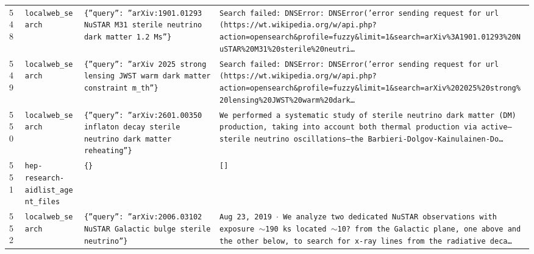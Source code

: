 \documentclass[11pt,a4paper]{article}
\begin{document}
\begin{longtable}{@{}p{}p{}p{}p{}@{}}
548 & \texttt{local}\newline\texttt{web\_\allowbreak{}search} & \texttt{\{''query'':\allowbreak{} ''arXiv:\allowbreak{}1901.01293 NuSTAR M31 sterile neutrino dark matter 1.2 Ms''\}\allowbreak{}} & \texttt{Search failed:\allowbreak{} DNSError:\allowbreak{} DNSError('error sending request for url (https:\allowbreak{}/\allowbreak{}/\allowbreak{}wt.wikipedia.org/\allowbreak{}w/\allowbreak{}api.php?action=\allowbreak{}opensearch\&profile=\allowbreak{}fuzzy\&limit=\allowbreak{}1\&search=\allowbreak{}arXiv\%3A1901.01293\%20NuSTAR\%20M31\%20sterile\%20neutri\ldots{}\allowbreak{}} \\
549 & \texttt{local}\newline\texttt{web\_\allowbreak{}search} & \texttt{\{''query'':\allowbreak{} ''arXiv 2025 strong lensing JWST warm dark matter constraint m\_\allowbreak{}th''\}\allowbreak{}} & \texttt{Search failed:\allowbreak{} DNSError:\allowbreak{} DNSError('error sending request for url (https:\allowbreak{}/\allowbreak{}/\allowbreak{}wt.wikipedia.org/\allowbreak{}w/\allowbreak{}api.php?action=\allowbreak{}opensearch\&profile=\allowbreak{}fuzzy\&limit=\allowbreak{}1\&search=\allowbreak{}arXiv\%202025\%20strong\%20lensing\%20JWST\%20warm\%20dark\ldots{}\allowbreak{}} \\
550 & \texttt{local}\newline\texttt{web\_\allowbreak{}search} & \texttt{\{''query'':\allowbreak{} ''arXiv:\allowbreak{}2601.00350 inflaton decay sterile neutrino dark matter reheating''\}\allowbreak{}} & \texttt{We performed a systematic study of sterile neutrino dark matter (DM)\allowbreak{} production,\allowbreak{} taking into account both thermal production via active--sterile neutrino oscillations---the Barbieri-Dolgov-Kainulainen-Do\ldots{}\allowbreak{}} \\
551 & \texttt{hep-research-aid}\newline\texttt{list\_\allowbreak{}agent\_\allowbreak{}files} & \texttt{\{\}\allowbreak{}} & \texttt{[]\allowbreak{}} \\
552 & \texttt{local}\newline\texttt{web\_\allowbreak{}search} & \texttt{\{''query'':\allowbreak{} ''arXiv:\allowbreak{}2006.03102 NuSTAR Galactic bulge sterile neutrino''\}\allowbreak{}} & \texttt{Aug 23,\allowbreak{} 2019 $\cdot$ We analyze two dedicated NuSTAR observations with exposure $\sim$190 ks located $\sim$10? from the Galactic plane,\allowbreak{} one above and the other below,\allowbreak{} to search for x-ray lines from the radiative deca\ldots{}\allowbreak{}} \\

\end{longtable}
\end{document}
